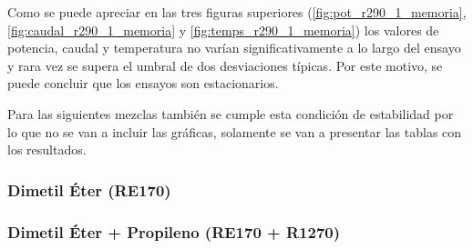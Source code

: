 \documentclass[../main.tex]{subfiles}
\begin{document}
Como se puede apreciar en las tres figuras superiores (\ref{fig:pot_r290_1_memoria}, \ref{fig:caudal_r290_1_memoria} y \ref{fig:temps_r290_1_memoria}) los valores de potencia, caudal y temperatura no varían significativamente a lo largo del ensayo y rara vez se supera el umbral de dos desviaciones típicas. Por este motivo, se puede concluir que los ensayos son estacionarios.

Para las siguientes mezclas también se cumple esta condición de estabilidad por lo que no se van a incluir las gráficas, solamente se van a presentar las tablas con los resultados.

\begin{table}[H]
    \centering
    
    \caption{Resultados experintales R290}
    \label{fig:res_exp_r290_memoria}
\end{table}

\newpage

\subsubsection{Dimetil Éter (RE170)}
\begin{table}[ht]
    \centering
    
    \caption{Resultados experintales RE170}
    \label{fig:res_exp_RE170_memoria}
\end{table}

\newpage
\subsubsection{Dimetil Éter + Propileno (RE170 + R1270)}

\begin{table}[ht]
    \centering
    {\setlength{\extrarowheight}{0pt}
    \renewcommand{\arraystretch}{1.12}
    }
    \caption{Resultados experintales RE170 / R1270 (95\% / 5\%)}
    \label{fig:res_exp_RE170_R1270_95_5_memoria}
\end{table}

\begin{table}[ht]
    \centering
    {\setlength{\extrarowheight}{0pt}
    \renewcommand{\arraystretch}{1.12}
    }
    \caption{Resultados experintales RE170 / R1270 (90\% / 10\%)}
    \label{fig:res_exp_RE170_R1270_90_10_memoria}
\end{table}
\end{document}
